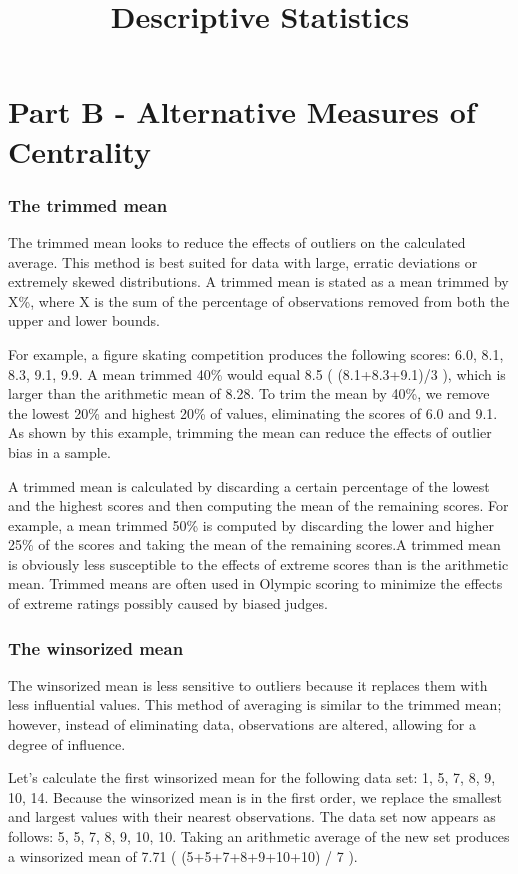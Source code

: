 \documentclass[12pt, a4paper]{report}
\title{Descriptive Statistics}
\begin{document}
\section*{Part B - Alternative Measures of Centrality}


\subsubsection{The trimmed mean}
The trimmed mean looks to reduce the effects of outliers on the calculated average. This method is best suited for data with large, erratic deviations or extremely skewed distributions.  A trimmed mean is stated as a mean trimmed by X\%, where X is the sum of the percentage of observations removed from both the upper and lower bounds.

For example, a figure skating competition produces the following scores: 6.0, 8.1, 8.3, 9.1, 9.9. A mean trimmed 40\% would equal 8.5 ( (8.1+8.3+9.1)/3 ), which is larger than the arithmetic mean of 8.28. To trim the mean by 40\%, we remove the lowest 20\% and highest 20\% of values, eliminating the scores of 6.0 and 9.1. As shown by this example, trimming the mean can reduce the effects of outlier bias in a sample.

A trimmed mean is calculated by discarding a certain percentage of the lowest and the highest scores and then computing the mean of the remaining scores. For example, a mean trimmed 50\% is computed by discarding the lower and higher 25\% of the scores and taking the mean of the remaining scores.A trimmed mean is obviously less susceptible to the effects of extreme scores than is the arithmetic mean. Trimmed means are often used in Olympic scoring to minimize the effects of extreme ratings possibly caused by biased judges.


\subsubsection{The winsorized mean}

The winsorized mean is less sensitive to outliers because it replaces them with less influential values. This method of averaging is similar to the trimmed mean; however, instead of eliminating data, observations are altered, allowing for a degree of influence.

Let's calculate the first winsorized mean for the following data set: 1, 5, 7, 8, 9, 10, 14. Because the winsorized mean is in the first order, we replace the smallest and largest values with their nearest observations. The data set now appears as follows: 5, 5, 7, 8, 9, 10, 10. Taking an arithmetic average of the new set produces a winsorized mean of 7.71 ( (5+5+7+8+9+10+10) / 7 ).
\end{document}
